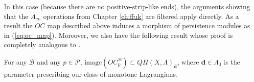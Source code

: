 
In this case (because there are no positive-strip-like ends), the arguments showing that the $A_{\infty}$ operations from Chapter \ref{ch:ffuk} are filtered apply directly.  As a result the $OC$ map described above induces  a morphism of persistence modules as in (\ref{eq:oc_map}). Moreover, we also have the following result whose proof is completely analogous to \cite[Corollary 2.11]{she:fanofuk}.
\begin{lem}
	For any $\mathcal{B}$ and any $p\in \mathcal{P}$, $\text{image}(OC^\mathcal{B}_p)\subset QH(X,\Lambda)_\mathbf{d}$, where $\mathbf{d}\in \Lambda_0$ is the parameter prescribing our class of monotone Lagrangians.
\end{lem}

